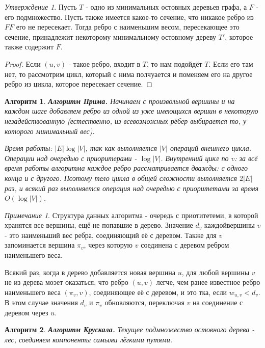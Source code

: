\documentclass[a4paper]{article}
\theoremstyle{indented}
\newtheorem{alg}{Алгоритм}
\theoremstyle{definition}
\theoremstyle{remark}
\newtheorem{remark}{Примечание}
\newtheorem{stat}{Утверждение}
\begin{document}
\begin{stat}
    Пусть $T$ - одно из минимальных остовных деревьев графа, а $F$ - его подмножество. Пусть также имеется какое-то сечение, что никакое ребро из $FF$ его не пересекает. Тогда ребро с наименьшим весом, пересекающее это сечение, принадлежит некоторому минимальному остовному дереву $T'$, которое также содержит $F$. 
\end{stat}

\begin{proof}
    Если $(u, v)$ - такое ребро, входит в $T$, то нам подойдёт $T$. Если его там нет, то рассмотрим цикл, который с нима полчуается и поменяем его на другое ребро из цикла, которое пересекает сечение.
\end{proof}

\begin{alg}
    \textbf{Алгоритм Прима.} Начинаем с произвольной вершины и на каждом шаге добавляем ребро из одной из уже имеющихся вершин в некоторую незадействованную (естественно, из всевозможных рёбер выбирается то, у которого минимальный вес). \ 
    
    Время работы: $|E|\log |V|$, так как выполняется $|V|$ операций внешнего цикла. Операции над очередью с приоритерами - $\log|V|$. Внутренний цикл по $v$: за всё время работы алгоритма каждое ребро рассматривается дважды: с одного конца и с другого. Поэтому тело цикла в общей сложности выполняется $2|E|$ раз, и всякий раз выполняется операция над очередью с приоритетами за время $O(\log |V|)$. 
\end{alg}

\begin{remark}
    Структура данных алгоритма - очередь с приотитетеми, в которой хранятся все вершины, ещё не попавшие в дерево. Значение $d_v$ каждойвершины $v$ - это наименьший вес ребра, соединяющий её с деревом. Также для $v$ запоминается вершина $\pi_v$, через которую $v$ соединена с деревом ребром наименьшего веса. \ 

    Всякий раз, когда в дерево добавляется новая вершина $u$, для любой вершины $v$ не из дерева моэет оказаться, что ребро $(u, v)$ легче, чем ранее известное ребро наименьшего веса $(\pi_v, v)$, соединяющее её с деревом, и это тка, если $w_{u, v}<d_v$. В этом случае значения $d_v$ и $\pi_v$ обновляются, переключая $v$ на соединение с деревом через $u$. 
\end{remark}

\begin{alg}
    \textbf{Алгоритм Крускала.} Текущее подмножество остовного дерева - лес, соединяем компоненты самыми лёгкими путями.
\end{alg}
\end{document}
